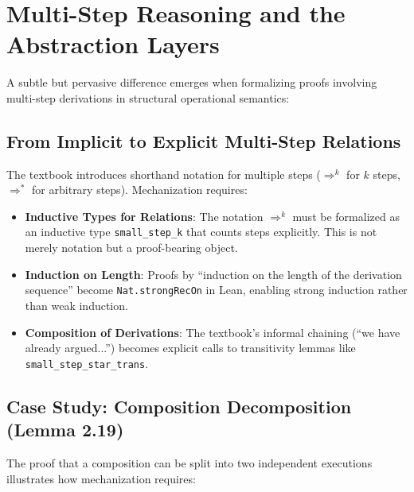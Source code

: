 %
%
%
\section{Multi-Step Reasoning and the Abstraction Layers}
\label{discussion:sec:multistep}

A subtle but pervasive difference emerges when formalizing proofs involving
multi-step derivations in structural operational semantics:

\subsection*{From Implicit to Explicit Multi-Step Relations}

The textbook introduces shorthand notation for multiple steps
($\Rightarrow^k$ for $k$ steps, $\Rightarrow^*$ for arbitrary steps).
Mechanization requires:

\begin{itemize}
    \item \textbf{Inductive Types for Relations}:
    The notation $\Rightarrow^k$ must be formalized as an inductive type
    \texttt{small\_step\_k} that counts steps explicitly. This is not merely
    notation but a proof-bearing object.
    
    \item \textbf{Induction on Length}:
    Proofs by ``induction on the length of the derivation sequence'' become
    \texttt{Nat.strongRecOn} in Lean, enabling strong induction rather than
    weak induction.
    
    \item \textbf{Composition of Derivations}:
    The textbook's informal chaining (``we have already argued...'') becomes
    explicit calls to transitivity lemmas like \\
    \texttt{small\_step\_star\_trans}.
\end{itemize}

\subsection*{Case Study: Composition Decomposition (Lemma 2.19)}

The proof that a composition can be split into two independent executions
illustrates how mechanization requires:

